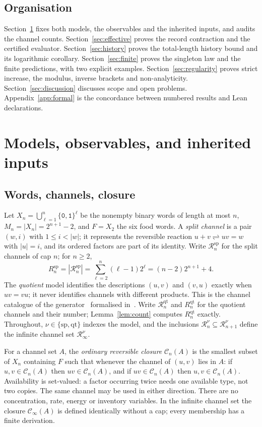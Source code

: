 \documentclass[11pt,a4paper]{article}
\theoremstyle{plain}
\theoremstyle{definition}
\theoremstyle{remark}
\newcommand{\cl}{\mathcal{C}}
\newcommand{\qt}{\mathrm{qt}}
\newcommand{\spc}{\mathrm{sp}}
\newcommand{\R}{\mathcal{R}}
\newcommand{\word}[1]{\mathtt{#1}}
\begin{document}
\subsection*{Organisation}
Section~\ref{sec:model} fixes both models, the observables and the inherited inputs, and audits the channel counts. Section~\ref{sec:effective} proves the record contraction and the certified evaluator. Section~\ref{sec:history} proves the total-length history bound and its logarithmic corollary. Section~\ref{sec:finite} proves the singleton law and the finite predictions, with two explicit examples. Section~\ref{sec:regularity} proves strict increase, the modulus, inverse brackets and non-analyticity. Section~\ref{sec:discussion} discusses scope and open problems. Appendix~\ref{app:formal} is the concordance between numbered results and Lean declarations.

\section{Models, observables, and inherited inputs}\label{sec:model}

\subsection{Words, channels, closure}
Let $X_n=\bigcup_{\ell=1}^n\{\word0,\word1\}^\ell$ be the nonempty binary words of length at most $n$, $M_n=|X_n|=2^{n+1}-2$, and $F=X_2$ the six food words. A \emph{split channel} is a pair $(w,i)$ with $1\le i<|w|$; it represents the reversible reaction $u+v\rightleftharpoons uv=w$ with $|u|=i$, and its ordered factors are part of its identity. Write $\R_n^{\spc}$ for the split channels of cap $n$; for $n\ge2$,
\begin{equation}\label{eq:splitcount}
R_n^{\spc}=|\R_n^{\spc}|=\sum_{\ell=2}^n(\ell-1)2^\ell=(n-2)2^{n+1}+4.
\end{equation}
The \emph{quotient} model identifies the descriptions $(u,v)$ and $(v,u)$ exactly when $uv=vu$; it never identifies channels with different products. This is the channel catalogue of the generator~\cite{varanasi2026repository} formalised in~\cite{overlapgateway2026,quotientwindow2026}. Write $\R_n^{\qt}$ and $R_n^{\qt}$ for the quotient channels and their number; Lemma~\ref{lem:count} computes $R_n^{\qt}$ exactly. Throughout, $\nu\in\{\spc,\qt\}$ indexes the model, and the inclusions $\R_n^\nu\subseteq\R_{n+1}^\nu$ define the infinite channel set $\R_\infty^\nu$.

For a channel set $A$, the \emph{ordinary reversible closure} $\cl_n(A)$ is the smallest subset of $X_n$ containing $F$ such that whenever the channel of $(u,v)$ lies in $A$: if $u,v\in\cl_n(A)$ then $uv\in\cl_n(A)$, and if $uv\in\cl_n(A)$ then $u,v\in\cl_n(A)$. Availability is set-valued: a factor occurring twice needs one available type, not two copies. The same channel may be used in either direction. There are no concentration, rate, energy or inventory variables. In the infinite channel set the closure $\cl_\infty(A)$ is defined identically without a cap; every membership has a finite derivation.
\end{document}
